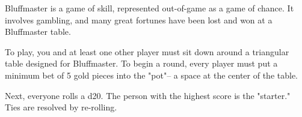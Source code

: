 \documentclass[green]{Kos}
\begin{document}
\name{\gBluffmaster{}}

Bluffmaster is a game of skill, represented out-of-game as a game of chance. It involves gambling, and many great fortunes have been lost and won at a Bluffmaster table.

To play, you and at least one other player must sit down around a triangular table designed for Bluffmaster. To begin a round, every player must put a minimum bet of 5 gold pieces into the "pot"-- a space at the center of the table. 

Next, everyone rolls a d20. The person with the highest score is the "starter." Ties are resolved by re-rolling. 
\end{document}
